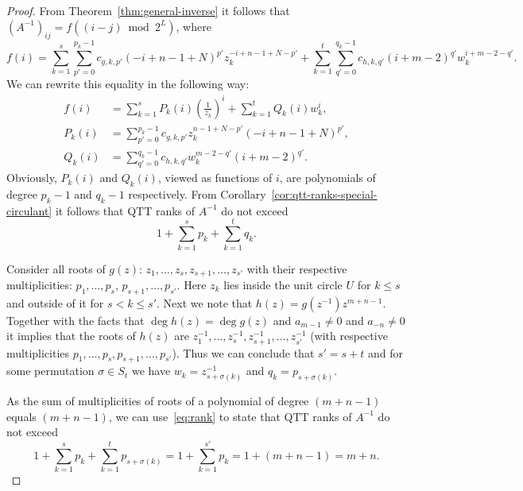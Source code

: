 \documentclass[a4paper]{article}
\newcommand{\LL}{L}
\newcommand{\base}{2}
\begin{document}
	\begin{proof}
        From Theorem~\ref{thm:general-inverse} it follows that $(A^{-1})_{ij} = f((i-j) \bmod \base^\LL)$, where 
        \[
        f(i) = 
    	\sum_{k=1}^s\sum_{p'=0}^{p_k-1}
    	c_{g,k,p'}
    	(-i+n-1+N)^{\underline{p}'} z_k^{-i+n-1+N-p'}
    	+
    	\sum_{k=1}^t\sum_{q'=0}^{q_k-1}
    	c_{h,k,q'}
    	(i+m-2)^{\underline{q}'}w_k^{i+m-2-q'}.
        \]
        We can rewrite this equality in the following way:
        \begin{align*}
        f(i) &= 
    	\sum_{k=1}^sP_k(i)\left(\frac{1}{z_k}\right)^{i}
    	+
    	\sum_{k=1}^tQ_k(i)w_k^{i},\\
    	P_k(i) &= 
    	\sum_{p'=0}^{p_k-1}
    	c_{g,k,p'}
    	z_k^{n-1+N-p'}
    	(-i+n-1+N)^{\underline{p}'}, \\
        Q_k(i) &=
    	\sum_{q'=0}^{q_k-1}
    	c_{h,k,q'}
    	w_k^{m-2-q'}
    	(i+m-2)^{\underline{q}'}.
        \end{align*}
        Obviously, $P_k(i)$ and $Q_k(i)$, viewed as functions of $i$, are polynomials of degree $p_k-1$ and $q_k-1$ respectively.
        From Corollary~\ref{cor:qtt-ranks-special-circulant} it follows that QTT ranks of $A^{-1}$ do not exceed
        \begin{equation}\label{eq:rank}
        1 + \sum_{k=1}^s p_k + \sum_{k=1}^t q_k.    
        \end{equation}
        
        Consider all roots of $g(z)$:  $z_1, \dots, z_s, z_{s+1}, \dots, z_{s'}$ with their respective multiplicities: $p_1, \dots, p_s$, $p_{s+1}, \dots, p_{s'}$.
        Here $z_k$ lies inside the unit circle $U$ for $k \le s$ and outside of it for $s < k \le s'$.
        Next we note that $h(z) = g(z^{-1})z^{m+n-1}$.
        Together with the facts that $\deg h(z) = \deg g(z)$ and $a_{m-1} \neq 0$ and $a_{-n} \neq 0$ it implies that the roots of $h(z)$ are $z_1^{-1}, \dots, z_s^{-1}, z_{s+1}^{-1}, \dots, z_{s'}^{-1}$ (with respective multiplicities $p_1, \dots, p_s, p_{s+1}, \dots, p_{s'}$).
        Thus we can conclude that $s' = s + t$ and for some permutation $\sigma \in S_t$ we have $w_{k} = z_{s+\sigma(k)}^{-1}$ and $q_k = p_{s+\sigma(k)}$.
        
        As the sum of multiplicities of roots of a polynomial of degree $(m + n -1)$   equals $(m+n-1)$, we can use~\eqref{eq:rank} to state that QTT ranks of $A^{-1}$ do not exceed
        \[
            1 + \sum_{k=1}^s p_k + \sum_{k=1}^t p_{s+\sigma(k)}
            =
            1 + \sum_{k=1}^{s'} p_k = 1 + (m+n-1) = m+n. 
        \]
	\end{proof}
	
\end{document}
